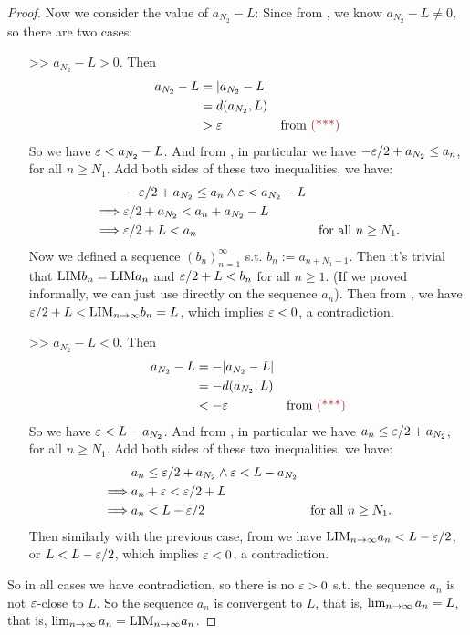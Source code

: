 \begin{proof}
Now we consider the value of \(a_{N_2} - L\):
Since from \MAROON{(***)}, we know \(a_{N_2} - L \neq 0\), so there are two cases:
\begin{itemize}
    \item[>>] \(a_{N_2} - L > 0\). Then
        \begin{align*}
            a_{N_2} - L & = \abs{a_{N_2} - L} \\
                        & = d(a_{N_2}, L) \\
                        & > \varE & \text{from \MAROON{(***)}}
        \end{align*}
        So we have \(\varepsilon < a_{N_2} - L\).
        And from \BLUE{(*)}, in particular we have \(-\varepsilon/2 + a_{N_2} \le a_n\), for all \(n \ge N_1\).
        Add both sides of these two inequalities, we have:
        \begin{align*}
                     & -\varepsilon/2 + a_{N_2} \le a_n \land \varepsilon < a_{N_2} - L \\
            \implies & \varepsilon/2 + a_{N_2} < a_n + a_{N_2} - L \\
            \implies & \varepsilon/2 + L < a_n & \text{for all \(n \ge N_1\).}
        \end{align*}
        Now we defined a sequence \((b_n)_{n = 1}^{\infty}\) s.t. \(b_n := a_{n + N_1 - 1}\).
        Then it's trivial that \(\text{LIM} b_n = \text{LIM} a_n\) and \(\varepsilon/2 + L < b_n\) for all \(n \ge 1\). (If we proved informally, we can just use  directly on the sequence \(a_n\)).
        Then from , we have \(\varepsilon/2 + L < \text{LIM}_{n \to \infty} b_n = L\),
        which implies \(\varepsilon < 0\), a contradiction.
    \item[>>] \(a_{N_2} - L < 0\). Then
        \begin{align*}
            a_{N_2} - L & = -\abs{a_{N_2} - L} \\
                        & = -d(a_{N_2}, L) \\
                        & < -\varE & \text{from \MAROON{(***)}}
        \end{align*}
        So we have \(\varepsilon < L - a_{N_2}\).
        And from \BLUE{(*)}, in particular we have \(a_n \le \varepsilon/2 + a_{N_2}\), for all \(n \ge N_1\).
        Add both sides of these two inequalities, we have:
        \begin{align*}
                     & a_n \le \varepsilon/2 + a_{N_2} \land \varepsilon < L - a_{N_2} \\
            \implies & a_n + \varepsilon < \varepsilon/2 + L \\
            \implies & a_n < L - \varepsilon/2 & \text{for all \(n \ge N_1\).}
        \end{align*}
        Then similarly with the previous case, from  we have \(\text{LIM}_{n \to \infty} a_n < L - \varepsilon/2\), or \(L < L - \varepsilon/2\), which implies \(\varepsilon < 0\), a contradiction.
\end{itemize}
So in all cases we have contradiction, so there is no \(\varepsilon > 0\) s.t. the sequence \(a_n\) is not \(\varepsilon\)-close to \(L\).
So the sequence \(a_n\) is convergent to \(L\), that is, \(\lim_{n \to \infty} a_n = L\), that is, \(\lim_{n \to \infty} a_n = \text{LIM}_{n \to \infty} a_n\).
\end{proof}

